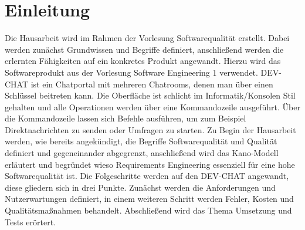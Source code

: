 \section{Einleitung}
Die Hausarbeit wird im Rahmen der Vorlesung Softwarequalität erstellt.
Dabei werden zunächst Grundwissen und Begriffe definiert, anschließend werden die erlernten Fähigkeiten auf ein konkretes Produkt angewandt.
Hierzu wird das Softwareprodukt  aus der Vorlesung Software Engineering 1 verwendet.
\newparagraph
DEV-CHAT ist ein Chatportal mit mehreren Chatrooms, denen man über einen Schlüssel beitreten kann.
Die Oberfläche ist schlicht im Informatik/Konsolen Stil gehalten und alle Operationen werden über eine Kommandozeile ausgeführt.
Über die Kommandozeile lassen sich Befehle ausführen, um zum Beispiel Direktnachrichten zu senden oder Umfragen zu starten.
\newparagraph
Zu Begin der Hausarbeit werden, wie bereits angekündigt, die Begriffe Softwarequalität und Qualität definiert und gegeneinander abgegrenzt, anschließend wird das Kano-Modell erläutert und begründet wieso Requirements Engineering essenziell für eine hohe Softwarequalität ist.
Die Folgeschritte werden auf den DEV-CHAT angewandt, diese gliedern sich in drei Punkte.
Zunächst werden die Anforderungen und Nutzerwartungen definiert, in einem weiteren Schritt werden Fehler, Kosten und Qualitätsmaßnahmen behandelt.
Abschließend wird das Thema Umsetzung und Tests erörtert.